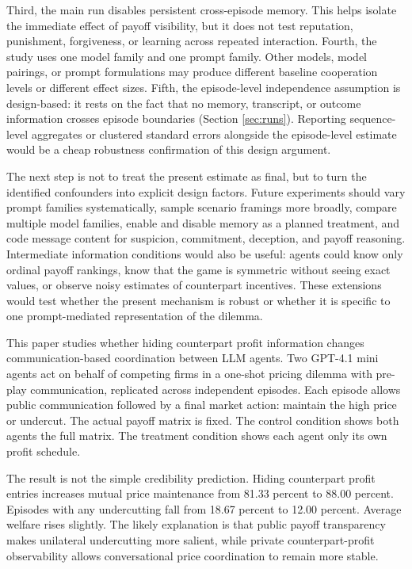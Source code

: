 \documentclass[11pt,a4paper]{article}
\makeatletter
\renewcommand\section{\@startsection{section}{1}{\z@}{9pt}{6pt}{\normalfont\fontsize{12pt}{14pt}\bfseries}}
\makeatother
\begin{document}
Third, the main run disables persistent cross-episode memory. This helps isolate the immediate effect of payoff visibility, but it does not test reputation, punishment, forgiveness, or learning across repeated interaction. Fourth, the study uses one model family and one prompt family. Other models, model pairings, or prompt formulations may produce different baseline cooperation levels or different effect sizes. Fifth, the episode-level independence assumption is design-based: it rests on the fact that no memory, transcript, or outcome information crosses episode boundaries (Section \ref{sec:runs}). Reporting sequence-level aggregates or clustered standard errors alongside the episode-level estimate would be a cheap robustness confirmation of this design argument.

The next step is not to treat the present estimate as final, but to turn the identified confounders into explicit design factors. Future experiments should vary prompt families systematically, sample scenario framings more broadly, compare multiple model families, enable and disable memory as a planned treatment, and code message content for suspicion, commitment, deception, and payoff reasoning. Intermediate information conditions would also be useful: agents could know only ordinal payoff rankings, know that the game is symmetric without seeing exact values, or observe noisy estimates of counterpart incentives. These extensions would test whether the present mechanism is robust or whether it is specific to one prompt-mediated representation of the dilemma.

\section{Conclusion}

This paper studies whether hiding counterpart profit information changes communication-based coordination between LLM agents. Two GPT-4.1 mini agents act on behalf of competing firms in a one-shot pricing dilemma with pre-play communication, replicated across independent episodes. Each episode allows public communication followed by a final market action: maintain the high price or undercut. The actual payoff matrix is fixed. The control condition shows both agents the full matrix. The treatment condition shows each agent only its own profit schedule.

The result is not the simple credibility prediction. Hiding counterpart profit entries increases mutual price maintenance from 81.33 percent to 88.00 percent. Episodes with any undercutting fall from 18.67 percent to 12.00 percent. Average welfare rises slightly. The likely explanation is that public payoff transparency makes unilateral undercutting more salient, while private counterpart-profit observability allows conversational price coordination to remain more stable.
\end{document}
